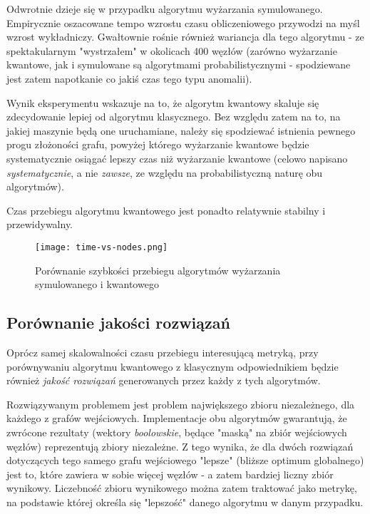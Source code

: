 \documentclass[12pt,a4paper,twoside,openany]{book}
\begin{document}
Odwrotnie dzieje się w przypadku algorytmu wyżarzania symulowanego.
Empirycznie oszacowane tempo wzrostu czasu obliczeniowego przywodzi na myśl wzrost wykładniczy.
Gwałtownie rośnie również wariancja dla tego algorytmu - ze spektakularnym "wystrzałem" w okolicach 400 węzłów (zarówno wyżarzanie kwantowe, jak i symulowane są algorytmami probabilistycznymi - spodziewane jest zatem napotkanie co jakiś czas tego typu anomalii).

Wynik eksperymentu wskazuje na to, że algorytm kwantowy skaluje się zdecydowanie lepiej od algorytmu klasycznego.
Bez względu zatem na to, na jakiej maszynie będą one uruchamiane, należy się spodziewać istnienia pewnego progu złożoności grafu, powyżej którego wyżarzanie kwantowe będzie systematycznie osiągać lepszy czas niż wyżarzanie kwantowe (celowo napisano \textit{systematycznie}, a nie \textit{zawsze}, ze względu na probabilistyczną naturę obu algorytmów). 

Czas przebiegu algorytmu kwantowego jest ponadto relatywnie stabilny i przewidywalny.



\begin{figure}[H]
\texttt{[image: time-vs-nodes.png]}
\caption{Porównanie szybkości przebiegu algorytmów wyżarzania symulowanego i kwantowego}
\label{fig:speed_comparison}
\end{figure}

\subsection{Porównanie jakości rozwiązań}
\label{subsection:quality-comp}

Oprócz samej skalowalności czasu przebiegu interesującą metryką, przy porównywaniu algorytmu kwantowego z klasycznym odpowiednikiem będzie również \textit{jakość rozwiązań} generowanych przez każdy z tych algorytmów.


Rozwiązywanym problemem jest problem największego zbioru niezależnego, dla każdego z grafów wejściowych.
Implementacje obu algorytmów gwarantują, że zwrócone rezultaty (wektory \textit{boolowskie}, będące "maską" na zbiór wejściowych węzłów) reprezentują zbiory niezależne.
Z tego wynika, że dla dwóch rozwiązań dotyczących tego samego grafu wejściowego "lepsze" (bliższe optimum globalnego) jest to, które zawiera w sobie więcej węzłów - a zatem bardziej liczny zbiór wynikowy.
Liczebność zbioru wynikowego można zatem traktować jako metrykę, na podstawie której określa się "lepszość" danego algorytmu w danym przypadku.
\end{document}
